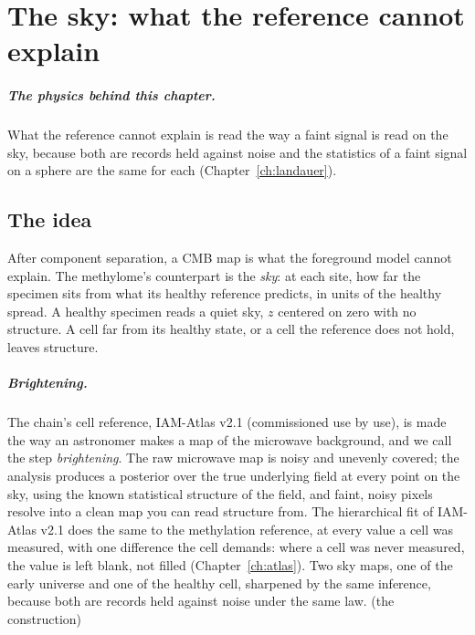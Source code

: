 \chapter{The sky: what the reference cannot explain}\label{ch:sky}

\paragraph{The physics behind this chapter.} What the reference cannot explain is read the way a faint signal is read on the sky, because both are records held against noise and the statistics of a faint signal on a sphere are the same for each (Chapter~\ref{ch:landauer}).

\section{The idea}

After component separation, a CMB map is what the foreground model cannot explain. The methylome's counterpart is the \emph{sky}: at each
site, how far the specimen sits from what its healthy reference predicts, in units of the healthy spread. A healthy specimen reads a quiet sky,
$z$ centered on zero with no structure. A cell far from its healthy state, or a cell the reference does not hold, leaves structure.

\paragraph{Brightening.} The chain's cell reference, IAM-Atlas v2.1 (commissioned use by use), is made the way an astronomer makes a map of the microwave background,
and we call the step \emph{brightening}. The raw microwave map is noisy and unevenly covered; the analysis produces a posterior over the
true underlying field at every point on the sky, using the known statistical structure of the field, and faint, noisy pixels resolve into
a clean map you can read structure from. The hierarchical fit of IAM-Atlas v2.1 does the same to the methylation reference, at every value a cell
was measured, with one difference the cell demands: where a cell was never measured, the value is left blank, not filled
(Chapter~\ref{ch:atlas}). Two sky maps, one of the early universe and one of the healthy cell, sharpened by the same inference, because both are records held against noise under the same law. \derived{} (the construction)

